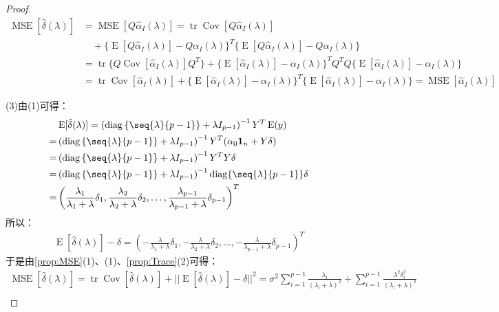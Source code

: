 \begin{proof}
	\begin{align*}
		\operatorname{MSE}[\hat{\delta}(\lambda)]&=\operatorname{MSE}[Q\hat{\alpha}_I(\lambda)]=\operatorname{tr}\operatorname{Cov}[Q\hat{\alpha}_I(\lambda)] \\
		&\quad+\{\operatorname{E}[Q\hat{\alpha}_I(\lambda)]-Q\alpha_I(\lambda)\}^T\{\operatorname{E}[Q\hat{\alpha}_I(\lambda)]-Q\alpha_I(\lambda)\} \\
		&=\operatorname{tr}\{Q\operatorname{Cov}[\hat{\alpha}_I(\lambda)]Q^T\}+\{\operatorname{E}[\hat{\alpha}_I(\lambda)]-\alpha_I(\lambda)\}^TQ^TQ\{\operatorname{E}[\hat{\alpha}_I(\lambda)]-\alpha_I(\lambda)\} \\
		&=\operatorname{tr}\operatorname{Cov}[\hat{\alpha}_I(\lambda)]+\{\operatorname{E}[\hat{\alpha}_I(\lambda)]-\alpha_I(\lambda)\}^T\{\operatorname{E}[\hat{\alpha}_I(\lambda)]-\alpha_I(\lambda)\}=\operatorname{MSE}[\hat{\alpha}_I(\lambda)]
	\end{align*}\par
	(3)由(1)可得：
	\begin{align*}
		&\operatorname{E}[\hat{\delta}(\lambda)]=\left(\operatorname{diag}\left\{\seq{\lambda}{p-1}\right\}+\lambda I_{p-1}\right)^{-1}Y^T\operatorname{E}(y) \\
		=&\left(\operatorname{diag}\left\{\seq{\lambda}{p-1}\right\}+\lambda I_{p-1}\right)^{-1}Y^T(\alpha_0\mathbf{1}_n+Y\delta) \\
		=&\left(\operatorname{diag}\left\{\seq{\lambda}{p-1}\right\}+\lambda I_{p-1}\right)^{-1}Y^TY\delta \\
		=&\left(\operatorname{diag}\left\{\seq{\lambda}{p-1}\right\}+\lambda I_{p-1}\right)^{-1}\operatorname{diag}\{\seq{\lambda}{p-1}\}\delta \\
		=&\left(\frac{\lambda_1}{\lambda_1+\lambda}\delta_1,\frac{\lambda_2}{\lambda_2+\lambda}\delta_2,\dots,\frac{\lambda_{p-1}}{\lambda_{p-1}+\lambda}\delta_{p-1}\right)^T
	\end{align*}
	所以：
	\begin{gather*}
		\operatorname{E}[\hat{\delta}(\lambda)]-\delta=\left(-\frac{\lambda}{\lambda_1+\lambda}\delta_1,-\frac{\lambda}{\lambda_2+\lambda}\delta_2,\dots,-\frac{\lambda}{\lambda_{p-1}+\lambda}\delta_{p-1}\right)^T
	\end{gather*}
	于是由\cref{prop:MSE}(1)、(1)、\cref{prop:Trace}(2)可得：
	\begin{gather*}
		\operatorname{MSE}[\hat{\delta}(\lambda)]=\operatorname{tr}\operatorname{Cov}[\hat{\delta}(\lambda)]+||\operatorname{E}[\hat{\delta}(\lambda)]-\delta||^2=\sigma^2\sum_{i=1}^{p-1}\frac{\lambda_i}{(\lambda_i+\lambda)^2}+\sum_{i=1}^{p-1}\frac{\lambda^2\delta_i^2}{(\lambda_i+\lambda)^2} \\

\end{gather*}
\end{proof}
